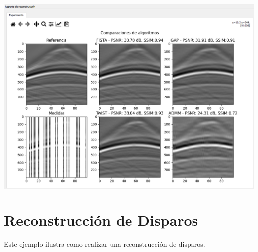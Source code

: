 \documentclass[12pt,twoside,letter]{ol-softwaremanual}
\newenvironment{Figure}
  {\par\medskip\noindent\minipage{\linewidth}}
  {\endminipage\par\medskip}
\begin{document}
\begin{enumerate}
	\begin{Figure}
		\centering
		\includegraphics[width=0.9\linewidth]{result-comp2.png}
		\label{fig:result-comp2}
	\end{Figure}

\end{enumerate}


\section{Reconstrucción de Disparos}

Este ejemplo ilustra como realizar una reconstrucción de disparos.
\end{document}
